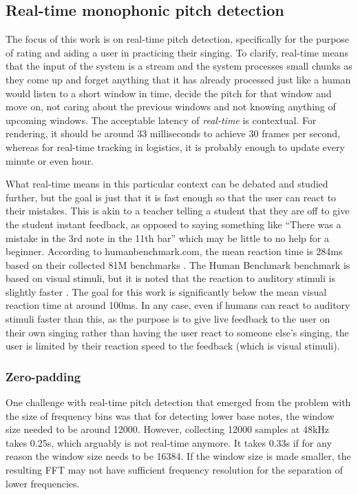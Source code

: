 \subsection{Real-time monophonic pitch detection}
The focus of this work is on real-time pitch detection, specifically for the purpose of rating and aiding a user in practicing their singing. To clarify, real-time means that the input of the system is a stream and the system processes small chunks as they come up and forget anything that it has already processed just like a human would listen to a short window in time, decide the pitch for that window and move on, not caring about the previous windows and not knowing anything of upcoming windows. The acceptable latency of \textit{real-time} is contextual. For rendering, it should be around 33 milliseconds to achieve 30 frames per second, whereas for real-time tracking in logistics, it is probably enough to update every minute or even hour. 

What real-time means in this particular context can be debated and studied further, but the goal is just that it is fast enough so that the user can react to their mistakes. This is akin to a teacher telling a student that they are off to give the student instant feedback, as opposed to saying something like “There was a mistake in the 3rd note in the 11th bar” which may be little to no help for a beginner. According to humanbenchmark.com, the mean reaction time is 284ms based on their collected 81M benchmarks \cite{HumanBenchmark2025}. The Human Benchmark benchmark is based on visual stimuli, but it is noted that the reaction to auditory stimuli is slightly faster \cite{SheltonKumar2010}. The goal for this work is significantly below the mean visual reaction time at around 100ms. In any case, even if humans can react to auditory stimuli faster than this, as the purpose is to give live feedback to the user on their own singing rather than having the user react to someone else's singing, the user is limited by their reaction speed to the feedback (which is visual stimuli).

\subsubsection{Zero-padding}
One challenge with real-time pitch detection that emerged from the problem with the size of frequency bins was that for detecting lower base notes, the window size needed to be around 12000. However, collecting 12000 samples at 48kHz takes 0.25s, which arguably is not real-time anymore. It takes 0.33s if for any reason the window size needs to be 16384. If the window size is made smaller, the resulting FFT may not have sufficient frequency resolution for the separation of lower frequencies. 

